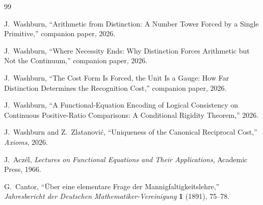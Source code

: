 \documentclass[11pt,a4paper]{article}
\theoremstyle{definition}
\theoremstyle{remark}
\begin{document}
\begin{thebibliography}{99}

J.~Washburn,
``Arithmetic from Distinction: A Number Tower Forced by a Single Primitive,''
companion paper, 2026.

J.~Washburn,
``Where Necessity Ends: Why Distinction Forces Arithmetic but Not the
Continuum,'' companion paper, 2026.

J.~Washburn,
``The Cost Form Is Forced, the Unit Is a Gauge: How Far Distinction Determines
the Recognition Cost,'' companion paper, 2026.

J.~Washburn,
``A Functional-Equation Encoding of Logical Consistency on Continuous
Positive-Ratio Comparisons: A Conditional Rigidity Theorem,'' 2026.

J.~Washburn and Z.~Zlatanovi\'c,
``Uniqueness of the Canonical Reciprocal Cost,''
\emph{Axioms}, 2026.

J.~Acz\'el,
\emph{Lectures on Functional Equations and Their Applications},
Academic Press, 1966.

G.~Cantor,
``\"Uber eine elementare Frage der Mannigfaltigkeitslehre,''
\emph{Jahresbericht der Deutschen Mathematiker-Vereinigung} \textbf{1} (1891),
75--78.

\end{thebibliography}
\end{document}
